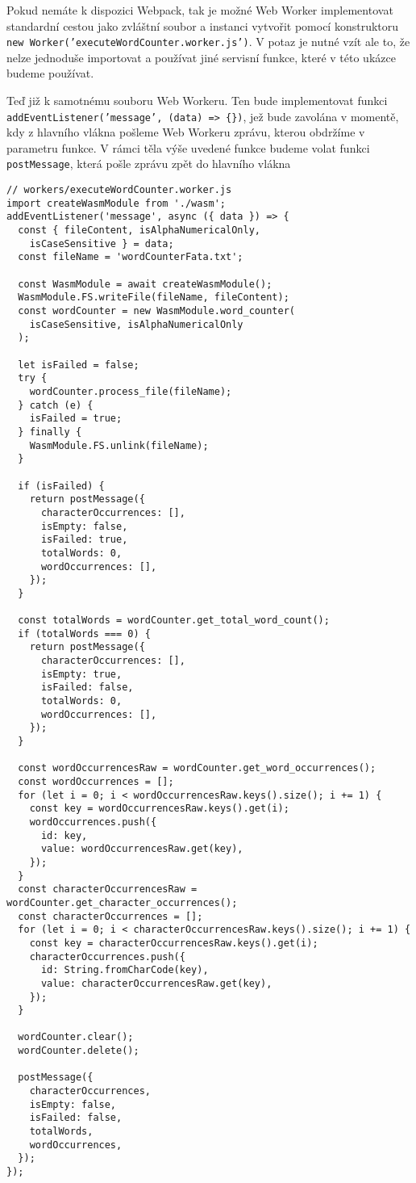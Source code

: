 \documentclass{{template/ctuthesis}}
\begin{document}
Pokud nemáte k dispozici Webpack, tak je možné Web Worker implementovat standardní cestou jako zvláštní soubor a instanci vytvořit pomocí konstruktoru \texttt{new Worker('executeWordCounter.worker.js')}. V potaz je nutné vzít ale to, že nelze jednoduše importovat a používat jiné servisní funkce, které v této ukázce budeme používat.

Teď již k samotnému souboru Web Workeru. Ten bude implementovat funkci \texttt{addEventListener('message', (data) => \{\})}, jež bude zavolána v momentě, kdy z hlavního vlákna pošleme Web Workeru zprávu, kterou obdržíme v parametru funkce. V rámci těla výše uvedené funkce budeme volat funkci \texttt{postMessage}, která pošle zprávu zpět do hlavního vlákna

\begin{verbatim}
// workers/executeWordCounter.worker.js
import createWasmModule from './wasm';
addEventListener('message', async ({ data }) => {
  const { fileContent, isAlphaNumericalOnly,
    isCaseSensitive } = data;
  const fileName = 'wordCounterFata.txt';

  const WasmModule = await createWasmModule();
  WasmModule.FS.writeFile(fileName, fileContent);
  const wordCounter = new WasmModule.word_counter(
    isCaseSensitive, isAlphaNumericalOnly
  );

  let isFailed = false;
  try {
    wordCounter.process_file(fileName);
  } catch (e) {
    isFailed = true;
  } finally {
    WasmModule.FS.unlink(fileName);
  }

  if (isFailed) {
    return postMessage({
      characterOccurrences: [],
      isEmpty: false,
      isFailed: true,
      totalWords: 0,
      wordOccurrences: [],
    });
  }

  const totalWords = wordCounter.get_total_word_count();
  if (totalWords === 0) {
    return postMessage({
      characterOccurrences: [],
      isEmpty: true,
      isFailed: false,
      totalWords: 0,
      wordOccurrences: [],
    });
  }

  const wordOccurrencesRaw = wordCounter.get_word_occurrences();
  const wordOccurrences = [];
  for (let i = 0; i < wordOccurrencesRaw.keys().size(); i += 1) {
    const key = wordOccurrencesRaw.keys().get(i);
    wordOccurrences.push({
      id: key,
      value: wordOccurrencesRaw.get(key),
    });
  }
  const characterOccurrencesRaw = wordCounter.get_character_occurrences();
  const characterOccurrences = [];
  for (let i = 0; i < characterOccurrencesRaw.keys().size(); i += 1) {
    const key = characterOccurrencesRaw.keys().get(i);
    characterOccurrences.push({
      id: String.fromCharCode(key),
      value: characterOccurrencesRaw.get(key),
    });
  }

  wordCounter.clear();
  wordCounter.delete();
  
  postMessage({
    characterOccurrences,
    isEmpty: false,
    isFailed: false,
    totalWords,
    wordOccurrences,
  });
});

\end{verbatim}
\end{document}
